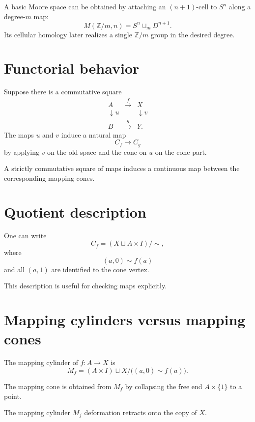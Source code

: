 A basic Moore space can be obtained by attaching an \((n+1)\)-cell to \(S^n\)
along a degree-\(m\) map:
\[
M(\mathbb Z/m,n)
=
S^n\cup_{m}D^{n+1}.
\]
Its cellular homology later realizes a single \(\mathbb Z/m\) group in the
desired degree.

\section{Functorial behavior}

Suppose there is a commutative square
\[
\begin{array}{ccc}
A&\xrightarrow{f}&X\\
\downarrow u&&\downarrow v\\
B&\xrightarrow{g}&Y.
\end{array}
\]
The maps \(u\) and \(v\) induce a natural map
\[
C_f\to C_g
\]
by applying \(v\) on the old space and the cone on \(u\) on the cone part.

\begin{proposition}
\label{prop:viii07-functorial}
A strictly commutative square of maps induces a continuous map between the
corresponding mapping cones.
\end{proposition}

\section{Quotient description}

One can write
\[
C_f=
(X\sqcup A\times I)/\!\sim,
\]
where
\[
(a,0)\sim f(a)
\]
and all \((a,1)\) are identified to the cone vertex.

This description is useful for checking maps explicitly.

\section{Mapping cylinders versus mapping cones}

\begin{definition}
\label{def:viii07-mapping-cylinder}
The mapping cylinder of \(f:A\to X\) is
\[
M_f=(A\times I)\sqcup X/\bigl((a,0)\sim f(a)\bigr).
\]
\end{definition}

The mapping cone is obtained from \(M_f\) by collapsing the free end
\(A\times\{1\}\) to a point.

\begin{proposition}
\label{prop:viii07-cylinder-retract}
The mapping cylinder \(M_f\) deformation retracts onto the copy of \(X\).
\end{proposition}

